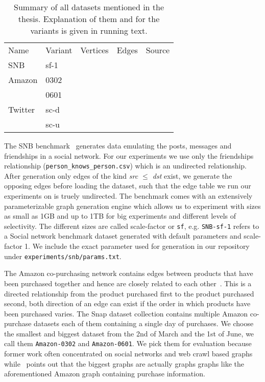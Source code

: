 \begin{table}[]  %
    \begin{tabular}{lllll}
        Name    & Variant & Vertices & Edges & Source          \\
        SNB     & sf-1    &          &       & \cite{snb}      \\
        Amazon  & 0302    &          &       & \cite{snapnets} \\
                & 0601    &          &       & \cite{snapnets} \\
        Twitter & sc-d    &          &       & \cite{snapnets} \\
                & sc-u    &          &       & \cite{snapnets}
    \end{tabular}
    \caption{Summary of all datasets mentioned in the thesis.
      Explanation of them and for the variants is given in running text.
    }
    \label{table:datasets}
\end{table}


The SNB benchmark~\cite{snb} generates data emulating the posts, messages and friendships in a social network.
For our experiments we use only the friendships relationship (\texttt{person\_knows\_person.csv}) which is an undirected relationship.
After generation only edges of the kind \textit{src $\le$ dst} exist, we generate the opposing edges before loading the dataset, such that the edge table we run our experiments
on is truely undirected.
The benchmark comes with an extensively parameterizable graph generation engine
which allows us to experiment with sizes as small as 1GB and up to 1TB for big experiments and different levels of selectivity.
The different sizes are called scale-factor or \texttt{sf}, e.g. \texttt{SNB-sf-1} refers to a Social network benchmark dataset generated with
default parameters and scale-factor 1.
We include the exact parameter used for generation in our repository under \texttt{experiments/snb/params.txt}. %

The Amazon co-purchasing network contains edges between products that have been purchased together and hence are closely related to each other~\cite{snapnets}.
This is a directed relationship from the product purchased first to the product purchased second, both direction of an edge can exist if the order in which
products have been purchased varies.
The Snap dataset collection contains multiple Amazon co-purchase datasets each of them containing a single day of purchases.
We choose the smallest and biggest dataset from the 2nd of March and the 1st of June, we call them \texttt{Amazon-0302} and \texttt{Amazon-0601}.
We pick them for evaluation because former work often concentrated on social networks and web crawl based graphs~\cite{myria-detailed,ammar2018distributed}
while~\cite{salihoglu2018} points out that the biggest graphs are actually graphs graphs like the aforementioned Amazon graph containing purchase information.

